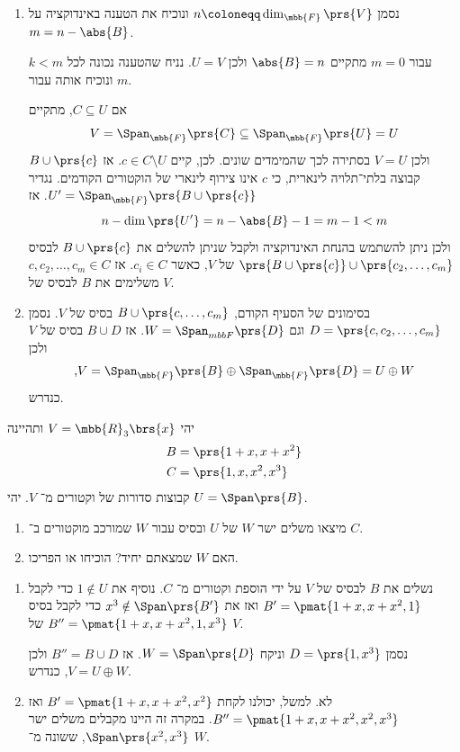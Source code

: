 \documentclass[a4paper,10pt,twoside,openany]{book}
\begin{document}
\begin{solution}
\begin{enumerate}
\item נסמן
$n \coloneqq \dim_{\mbb{F}}\prs{V}$
ונוכיח את הטענה באינדוקציה על
$m = n - \abs{B}$.

עבור
$m = 0$
מתקיים
$\abs{B} = n$
ולכן
$U = V$.
נניח שהטענה נכונה לכל
$k < m$
ונוכיח אותה עבור
$m$.

אם
$C \subseteq U$,
מתקיים
\[V = \Span_{\mbb{F}}\prs{C} \subseteq \Span_{\mbb{F}}\prs{U} = U\]
ולכן
$V = U$
בסתירה לכך שהמימדים שונים.
לכן, קיים
$c \in C \setminus U$.
אז
$B \cup \prs{c}$
קבוצה בלתי־תלויה לינארית, כי
$c$
אינו צירוף לינארי של הוקטורים הקודמים. נגדיר
$U' = \Span_{\mbb{F}}\prs{B \cup \prs{c}}$.
אז
\[n - \dim\prs{U'} = n - \abs{B} - 1 = m-1 < m\]
ולכן ניתן להשתמש בהנחת האינדוקציה ולקבל שניתן להשלים את
$B \cup \prs{c}$
לבסיס
$\prs{B \cup \prs{c}} \cup \prs{c_2, \ldots, c_m}$
של
$V$,
כאשר
$c_i \in C$.
אז
$c, c_2, \ldots, c_m \in C$
משלימים את
$B$
לבסיס של
$V$.

\item בסימונים של הסעיף הקודם,
$B \cup \prs{c, \ldots, c_m}$
בסיס של
$V$.
נסמן
$D = \prs{c, c_2, \ldots, c_m}$
וגם
$W = \Span_{mbb{F}}\prs{D}$.
אז
$B \cup D$
בסיס של
$V$
ולכן
\[\text{,} V = \Span_{\mbb{F}}\prs{B} \oplus \Span_{\mbb{F}}\prs{D} = U \oplus W\]
כנדרש.
\end{enumerate}
\end{solution}

\begin{exercise}
יהי
$V = \mbb{R}_3\brs{x}$
ותהיינה
\begin{align*}
B &= \prs{1+x, x+x^2} \\
C &= \prs{1, x, x^2, x^3}
\end{align*}
קבוצות סדורות של וקטורים מ־%
$V$.
יהי
$U = \Span\prs{B}$.

\begin{enumerate}
\item מיצאו משלים ישר
$W$
של
$U$
ובסיס עבור
$W$
שמורכב מוקטורים ב־%
$C$.
\item
האם
$W$
שמצאתם יחיד? הוכיחו או הפריכו.
\end{enumerate}
\end{exercise}

\begin{solution}
\begin{enumerate}
\item נשלים את
$B$
לבסיס של
$V$
על ידי הוספת וקטורים מ־%
$C$.
נוסיף את
$1 \notin U$
כדי לקבל
$B' = \pmat{1 + x, x + x^2, 1}$
ואז את
$x^3 \notin \Span\prs{B'}$
כדי לקבל בסיס
$B'' = \pmat{1 + x, x + x^2, 1, x^3}$
של
$V$.

נסמן
$D = \prs{1, x^3}$
וניקח
$W = \Span\prs{D}$.
אז
$B'' = B \cup D$
ולכן
$V = U \oplus W$,
כנדרש.

\item לא.
למשל, יכולנו לקחת
$B' = \pmat{1 + x, x + x^2, x^2}$
ואז
$B'' = \pmat{1 + x, x + x^2, x^2, x^3}$.
במקרה זה היינו מקבלים משלים ישר
$\Span\prs{x^2, x^3}$,
ששונה מ־%
$W$.
\end{enumerate}
\end{solution}
\end{document}
